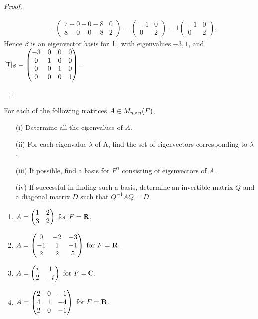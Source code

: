 \begin{proof}
\begin{enumerate}
\begin{align*}
        & = \begin{pmatrix} 7 - 0 + 0 - 8 & 0 \\ 8 - 0 + 0 - 8 & 2 \end{pmatrix}
          = \begin{pmatrix} -1 & 0 \\ 0 & 2 \end{pmatrix} = 1 \begin{pmatrix} -1 & 0 \\ 0 & 2 \end{pmatrix},
\end{align*}
Hence \(\beta\) is an eigenvector basis for \(\textsf{T}\), with eigenvalues \(-3, 1\),
and \([\textsf{T}]_{\beta} = \begin{pmatrix} -3 & 0 & 0 & 0 \\ 0 & 1 & 0 & 0 \\ 0 & 0 & 1 & 0 \\ 0 & 0 & 0 & 1 \end{pmatrix}\).
\end{enumerate}
\end{proof}

\begin{exercise} \label{exercise 5.1.4}
For each of the following matrices \(A \in M_{n \times n}(F)\),
\begin{enumerate}
\item[(i)] Determine all the eigenvalues of \(A\).
\item[(ii)] For each eigenvalue \(\lambda\) of A, find the set of eigenvectors corresponding to \(\lambda\).
\item[(iii)] If possible, find a basis for \(F^n\) consisting of eigenvectors of \(A\).
\item[(iv)] If successful in finding such a basis, determine an invertible matrix \(Q\) and a diagonal matrix \(D\) such that \(Q^{-1} A Q = D\).
\end{enumerate}

\begin{enumerate}
\item \(
    A = \begin{pmatrix} 1 & 2 \\ 3 & 2 \end{pmatrix} \text{ for } F = \mathbf{R}. \)
\item \(
    A = \begin{pmatrix} 0 & -2 & -3 \\ -1 & 1 & -1 \\ 2 & 2 & 5 \end{pmatrix} \text{ for } F = \mathbf{R}. \)
\item \(
    A = \begin{pmatrix} {i\mkern1mu} & 1 \\ 2 & -{i\mkern1mu} \end{pmatrix} \text{ for } F = \mathbf{C}. \)
\item \(
    A = \begin{pmatrix} 2 & 0 & -1 \\ 4 & 1 & -4 \\ 2 & 0 & -1 \end{pmatrix} \text{ for } F = \mathbf{R}. \)
\end{enumerate}
\end{exercise}

